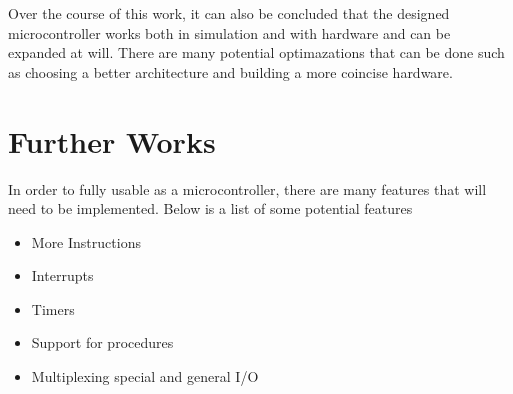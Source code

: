 Over the course of this work, it can also be concluded that the designed microcontroller works both in simulation and with hardware and can be expanded at will.
There are many potential optimazations that can be done such as choosing a better architecture and building a more coincise hardware. 

\section{Further Works}
In order to fully usable as a microcontroller, there are many features that will need to be implemented. Below is a list of some potential features
\begin{itemize}
    \item More Instructions
    \item Interrupts
    \item Timers
    \item Support for procedures
    \item Multiplexing special and general I/O
\end{itemize}
